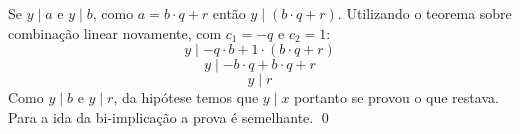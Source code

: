         Se $y \mid a$ e $y \mid b$, como $a = b \cdot q + r$ então
        $y \mid (b \cdot q + r)$. Utilizando o teorema sobre combinação linear novamente, com $c_1 = -q$ e $c_2 = 1$:
        \begin{equation*}
            y \mid -q \cdot b + 1 \cdot (b \cdot q + r) 
        \end{equation*}
        \begin{equation*}
            y \mid - b \cdot q + b \cdot q + r 
        \end{equation*}
        \begin{equation*}
            y \mid r 
        \end{equation*}
        Como $y \mid b$ e $y \mid r$, da hipótese temos que $y \mid x$ portanto se provou o que restava. Para a ida da bi-implicação a prova é semelhante. \qed

